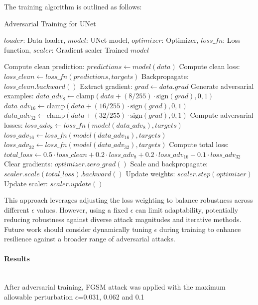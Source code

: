 \documentclass[../main.tex]{subfiles}
\begin{document}
The training algorithm is outlined as follows:
\begin{breakablealgorithm}{Adversarial Training for UNet}
\begin{algorithmic}[1]
\Require $loader$: Data loader, $model$: UNet model, $optimizer$: Optimizer, $loss\_fn$: Loss function, $scaler$: Gradient scaler
\Ensure Trained $model$

    \State Compute clean prediction: $predictions \gets model(data)$
    \State Compute clean loss: $loss\_clean \gets loss\_fn(predictions, targets)$
    \State Backpropagate: $loss\_clean.backward()$
    \State Extract gradient: $grad \gets data.grad$
    \State Generate adversarial examples:
    \State $data\_adv_8 \gets \text{clamp}(data + (8/255) \cdot \text{sign}(grad), 0, 1)$
    \State $data\_adv_{16} \gets \text{clamp}(data + (16/255) \cdot \text{sign}(grad), 0, 1)$
    \State $data\_adv_{32} \gets \text{clamp}(data + (32/255) \cdot \text{sign}(grad), 0, 1)$
    \State Compute adversarial losses:
    \State $loss\_adv_8 \gets loss\_fn(model(data\_adv_8), targets)$
    \State $loss\_adv_{16} \gets loss\_fn(model(data\_adv_{16}), targets)$
    \State $loss\_adv_{32} \gets loss\_fn(model(data\_adv_{32}), targets)$
    \State Compute total loss: $total\_loss \gets 0.5 \cdot loss\_clean + 0.2 \cdot loss\_adv_8 + 0.2 \cdot loss\_adv_{16} + 0.1 \cdot loss\_adv_{32}$
    \State Clear gradients: $optimizer.zero\_grad()$
    \State Scale and backpropagate: $scaler.scale(total\_loss).backward()$
    \State Update weights: $scaler.step(optimizer)$
    \State Update scaler: $scaler.update()$
\EndFor
\end{algorithmic}
\end{breakablealgorithm}

This approach leverages adjusting the loss weighting to balance robustness across different $\epsilon$ values. However, using a fixed $\epsilon$ can limit adaptability, potentially reducing robustness against diverse attack magnitudes and iterative methods. Future work should consider dynamically tuning $\epsilon$ during training to enhance resilience against a broader range of adversarial attacks.

\paragraph{Results}\leavevmode\\
After adversarial training, FGSM attack was applied  with the maximum allowable perturbation $\epsilon$=0.031,
0.062 and 0.1
\end{document}
